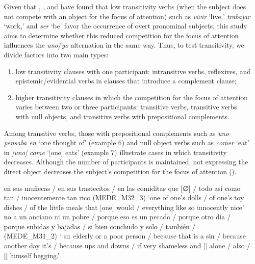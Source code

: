 \documentclass[output=paper]{langscibook}
\begin{document}
Given that \citet{Posio2011}, \citet{HurtadoOrtega-Santos2019}, and \citet{OrozcoHurtado2021} have found that low transitivity verbs (when the subject does not compete with an object for the focus of attention) such as \textit{vivir} ‘live,’ \textit{trabajar} ‘work,’ and \textit{ser} ‘be’ favor the occurrence of overt pronominal subjects, this study aims to determine whether this reduced competition for the focus of attention influences the \textit{uno}/\textit{yo} alternation in the same way. Thus, to test transitivity, we divide factors into two main types: 


\begin{enumerate}
 \item\sloppy low transitivity clauses with one participant: intransitive verbs, reflexives, and epistemic/evidential verbs in clauses that introduce a complement clause;  
 \item higher transitivity clauses in which the competition for the focus of attention varies between two or three participants: transitive verbs, transitive verbs with null objects, and transitive verbs with prepositional complements. 
\end{enumerate}


Among transitive verbs, those with prepositional complements such as \textit{uno pensaba en} ‘one thought of’ (example 6) and null object verbs such as \textit{comer} ‘eat’ in \textit{[uno] come} ‘[one] eats’ (example 7) illustrate cases in which transitivity decreases. Although the number of participants is maintained, not expressing the direct object decreases the subject's competition for the focus of attention (\citealt{Posio2011,Posio2013}). 



\eanoraggedright\label{ex:orozco:6}
  en sus muñecas / en sus trastecitos / en las comiditas que [∅]  / todo así como tan / inocentemente tan rico (MEDE\_M32\_3)
\glt ‘one   of one’s dolls / of one’s toy dishes / of the little meals that [one] would  / everything like so innocently nice’
\ex\label{ex:orozco:7}
 no  a un anciano ni un pobre / porque eso es un pecado / porque otro día   / porque   subidas y bajadas / si   bien conchudo y \ExHighlight{[∅]}  solo / también / \ExHighlight{[∅]}   . \ExHighlight(MEDE\_M31\_2)
\glt ‘    an elderly or a poor person / because that is a sin / because another day it’s  / because   ups and downs / if   very shameless and []  alone / also / []  himself begging.’
\z
\end{document}
